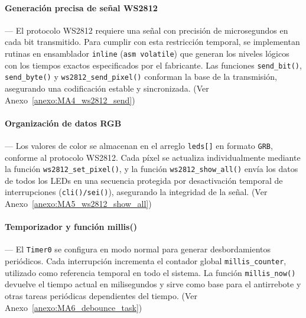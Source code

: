\vspace{1em}

\paragraph*{\textbf{Generación precisa de señal WS2812}}---
El protocolo WS2812 requiere una señal con precisión de microsegundos en cada bit transmitido. Para cumplir con esta restricción temporal, se implementan rutinas en ensamblador \texttt{inline} (\texttt{asm volatile}) que generan los niveles lógicos con los tiempos exactos especificados por el fabricante. Las funciones \texttt{send\_bit()}, \texttt{send\_byte()} y \texttt{ws2812\_send\_pixel()} conforman la base de la transmisión, asegurando una codificación estable y sincronizada. (Ver Anexo~\ref{anexo:MA4_ws2812_send})

\vspace{1em}

\paragraph*{\textbf{Organización de datos RGB}}---
Los valores de color se almacenan en el arreglo \texttt{leds[]} en formato \texttt{GRB}, conforme al protocolo WS2812. Cada píxel se actualiza individualmente mediante la función \texttt{ws2812\_set\_pixel()}, y la función \texttt{ws2812\_show\_all()} envía los datos de todos los LEDs en una secuencia protegida por desactivación temporal de interrupciones (\texttt{cli()/sei()}), asegurando la integridad de la señal. (Ver Anexo~\ref{anexo:MA5_ws2812_show_all})

\vspace{1em}

\paragraph*{\textbf{Temporizador y función millis()}}---
El \texttt{Timer0} se configura en modo normal para generar desbordamientos periódicos. Cada interrupción incrementa el contador global \texttt{millis\_counter}, utilizado como referencia temporal en todo el sistema. La función \texttt{millis\_now()} devuelve el tiempo actual en milisegundos y sirve como base para el antirrebote y otras tareas periódicas dependientes del tiempo. (Ver Anexo~\ref{anexo:MA6_debounce_task})



\vspace{1em}

